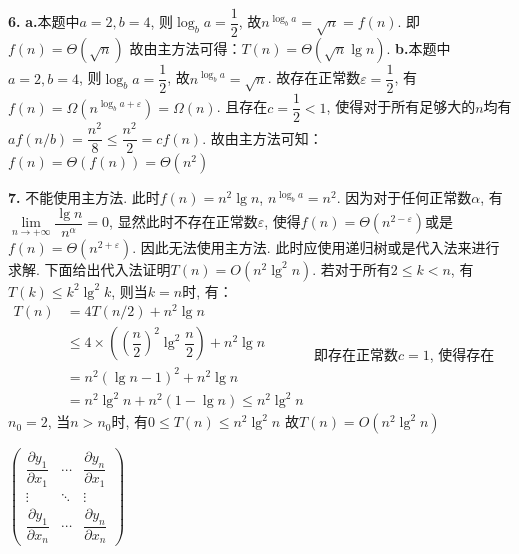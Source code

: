 \documentclass[UTF8]{ctexart}
\begin{document}
	\begin{solution}\textnormal{\textbf{6.}}
		\textbf{a.}本题中$a = 2, b = 4$, 则$\log_ba = \dfrac{1}{2}$, 故$n^{\log_ba} = \sqrt{n} = f(n)$. 即$f(n) = \Theta(\sqrt{n})$\newline
		故由主方法可得：$T(n) = \Theta(\sqrt{n}\lg n)$.\newline
		\textbf{b.}本题中$a = 2, b = 4$, 则$\log_ba = \dfrac{1}{2}$, 故$n^{\log_ba} = \sqrt{n}$.\newline
		故存在正常数$\varepsilon = \dfrac{1}{2}$, 有$f(n) = \Omega(n^{\log_ba + \varepsilon}) = \Omega(n)$.\newline
		且存在$c = \dfrac{1}{2} < 1$, 使得对于所有足够大的$n$均有$af(n/b) = \dfrac{n^2}{8} \leq \dfrac{n^2}{2} = cf(n)$.\newline
		故由主方法可知：$f(n) = \Theta(f(n)) = \Theta(n^2)$
	\end{solution}
	\begin{solution}\textnormal{\textbf{7.}}
		不能使用主方法.\newline
		此时$f(n) = n^2\lg n$, $n^{\log_ba} = n^2$. 因为对于任何正常数$\alpha$, 有$\lim\limits_{n \to +\infty}\dfrac{\lg n}{n^{\alpha}} = 0$, 显然此时不存在正常数$\varepsilon$, 使得$f(n) = \Theta(n^{2 - \varepsilon})$或是$f(n) = \Theta(n^{2 + \varepsilon})$. 因此无法使用主方法.\newline
		此时应使用递归树或是代入法来进行求解.\newline
		下面给出代入法证明$T(n) = O(n^{2}\lg^2 n)$.\newline
		若对于所有$2 \leq k < n$, 有$T(k) \leq k^2\lg^2 k$, 则当$k = n$时, 有：\newline
		$
		\begin{aligned}
			T(n) &= 4T(n/2) + n^2\lg n \\
			&\leq 4 \times \left(\left(\dfrac{n}{2}\right)^2\lg^2\dfrac{n}{2}\right) + n^2\lg n \\
			&= n^2(\lg n - 1)^2 + n^2\lg n \\
			&= n^2\lg^2n + n^2(1 - \lg n) \leq n^2\lg^2n
		\end{aligned}
		$\newline
		即存在正常数$c = 1$, 使得存在$n_0 = 2$, 当$n > n_0$时, 有$0 \leq T(n) \leq n^2\lg^2n$\newline
		故$T(n) = O(n^2\lg^2n)$
	\end{solution}
	$	%
	\begin{pmatrix}
		\dfrac{\partial y_1}{\partial x_1} & \cdots & \dfrac{\partial y_n}{\partial x_1} \\
		\vdots & \ddots & \vdots \\
		\dfrac{\partial y_1}{\partial x_n} & \cdots & \dfrac{\partial y_n}{\partial x_n}
	\end{pmatrix}
	$
\end{document}
